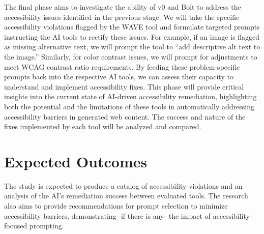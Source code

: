 \documentclass{article}
\begin{document}
The final phase aims to investigate the ability of v0 and Bolt to address the accessibility issues identified in the previous stage.
We will take the specific accessibility violations flagged by the WAVE tool and formulate targeted prompts instructing the AI tools to rectify these issues.
For example, if an image is flagged as missing alternative text, we will prompt the tool to ``add descriptive alt text to the image.''
Similarly, for color contrast issues, we will prompt for adjustments to meet WCAG contrast ratio requirements.
By feeding these problem-specific prompts back into the respective AI tools, we can assess their capacity to understand and implement accessibility fixes.
This phase will provide critical insights into the current state of AI-driven accessibility remediation,
highlighting both the potential and the limitations of these tools in automatically addressing accessibility barriers in generated web content.
The success and nature of the fixes implemented by each tool will be analyzed and compared.

\section{Expected Outcomes}
The study is expected to produce a catalog of accessibility violations and an analysis of the AI's remediation success between evaluated tools.
The research also aims to provide recommendations for prompt selection to minimize accessibility barriers,
demonstrating -if there is any- the impact of accessibility-focused prompting.

\pagebreak



\end{document}
